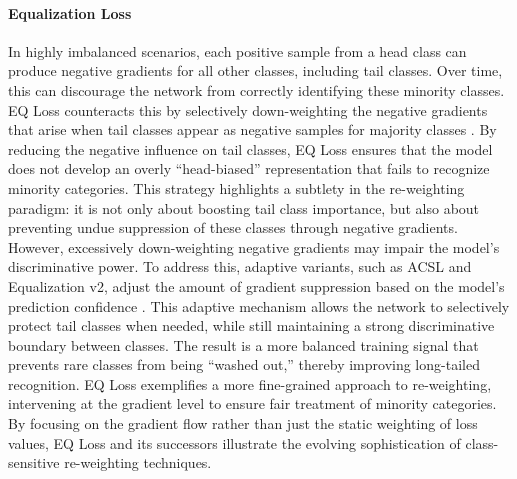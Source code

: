 \paragraph{Equalization Loss}
In highly imbalanced scenarios, each positive sample from a head class can produce negative gradients for all other classes, including tail classes. Over time, this can discourage the network from correctly identifying these minority classes. EQ Loss counteracts this by selectively down-weighting the negative gradients that arise when tail classes appear as negative samples for majority classes \cite{zhang2023deep}. By reducing the negative influence on tail classes, EQ Loss ensures that the model does not develop an overly “head-biased” representation that fails to recognize minority categories. This strategy highlights a subtlety in the re-weighting paradigm: it is not only about boosting tail class importance, but also about preventing undue suppression of these classes through negative gradients. However, excessively down-weighting negative gradients may impair the model’s discriminative power. To address this, adaptive variants, such as ACSL and Equalization v2, adjust the amount of gradient suppression based on the model’s prediction confidence \cite{tan2020equalizationlosslongtailedobject, zhang2023deep}. This adaptive mechanism allows the network to selectively protect tail classes when needed, while still maintaining a strong discriminative boundary between classes. The result is a more balanced training signal that prevents rare classes from being “washed out,” thereby improving long-tailed recognition. EQ Loss exemplifies a more fine-grained approach to re-weighting, intervening at the gradient level to ensure fair treatment of minority categories. By focusing on the gradient flow rather than just the static weighting of loss values, EQ Loss and its successors illustrate the evolving sophistication of class-sensitive re-weighting techniques.

